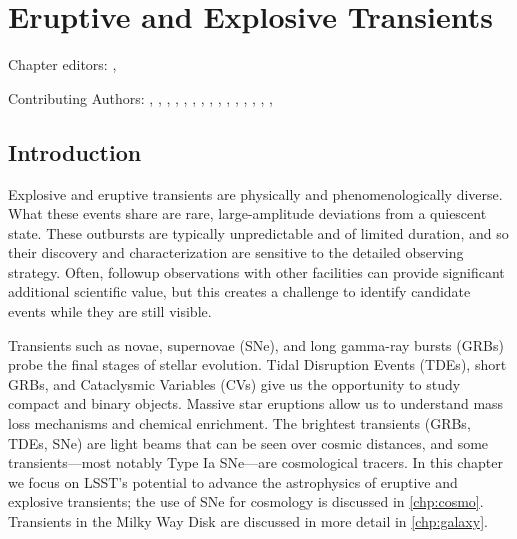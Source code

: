 
\chapter[Transients]{Eruptive and Explosive Transients}
\def\chpname{transients}\label{chp:\chpname}

Chapter editors:
,

Contributing Authors:
,
,
,
,
,
,
,
,
,
,
,
,
,
,
,


\section{Introduction}


Explosive and eruptive transients are physically and
phenomenologically diverse.   What these events share
are rare, large-amplitude deviations from a quiescent state.  These
outbursts are typically unpredictable and of limited duration, and so their
discovery and characterization are sensitive to the detailed observing
strategy.  Often, followup observations with other facilities can provide
significant additional scientific value, but this creates a challenge to
identify candidate events while they are still visible.

Transients such as novae, supernovae (SNe), and long gamma-ray bursts (GRBs)
probe the final stages of stellar evolution. Tidal Disruption Events
(TDEs), short GRBs, and
Cataclysmic Variables (CVs) give us the opportunity to study
compact and binary objects. Massive star eruptions allow us to understand
mass loss mechanisms and chemical enrichment.
The brightest transients (GRBs, TDEs,
SNe) are light beams that can be seen over cosmic distances, and some
transients---most notably Type Ia SNe---are cosmological tracers.
In this chapter we focus on LSST's potential to advance the astrophysics of
eruptive and explosive transients; the use of SNe for cosmology is
discussed in \autoref{chp:cosmo}. Transients in the Milky Way Disk are
discussed in more detail in \autoref{chp:galaxy}.

